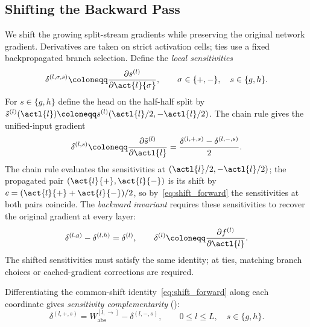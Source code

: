 \subsection{Shifting the Backward Pass}\label{subsec:backward_stabilization}

We shift the growing split-stream gradients while preserving the original network gradient. Derivatives are taken on strict activation cells; ties use a fixed backpropagated branch selection. Define the \emph{local sensitivities}
\begin{equation}
    \delta^{(l,\sigma,s)}\coloneqq\frac{\partial s^{(l)}}{\partial\act{l}{\sigma}},
    \qquad \sigma\in\{+,-\},\quad s\in\{g,h\}.
    \label{eq:local_sensitivities}
\end{equation}
For $s\in\{g,h\}$ define the head on the half-half split by $\tilde s^{(l)}(\actl{l})\coloneqq s^{(l)}(\actl{l}/2,-\actl{l}/2)$. The chain rule gives the unified-input gradient
\begin{equation}
\delta^{(l,s)}\coloneqq\frac{\partial\tilde s^{(l)}}{\partial\actl{l}}
=\frac{\delta^{(l,+,s)}-\delta^{(l,-,s)}}2.
\label{eq:unified_split_gradients}
\end{equation}
The chain rule evaluates the sensitivities at $(\actl{l}/2,-\actl{l}/2)$; the propagated pair $(\act{l}{+},\act{l}{-})$ is its shift by $c=(\act{l}{+}+\act{l}{-})/2$, so by~\eqref{eq:shift_forward} the sensitivities at both pairs coincide.
The \emph{backward invariant} requires these sensitivities to recover the original gradient at every layer:
\begin{equation}
\delta^{(l,g)}-\delta^{(l,h)}=\delta^{(l)},
\qquad
\delta^{(l)}\coloneqq\frac{\partial f^{(l)}}{\partial\actl{l}}.
\label{eq:stabilization_backward_invariant}
\end{equation}
The shifted sensitivities must satisfy the same identity; at ties, matching branch choices or cached-gradient corrections are required.

Differentiating the common-shift identity~\eqref{eq:shift_forward} along each coordinate gives \emph{sensitivity complementarity} ():
\begin{equation}
    \delta^{(l,+,s)}=W_{\mathrm{abs}}^{[l,\rightarrow]}-\delta^{(l,-,s)},
    \qquad 0\le l\le L,\quad s\in\{g,h\}.
    \label{eq:delta_complementarity}
\end{equation}

